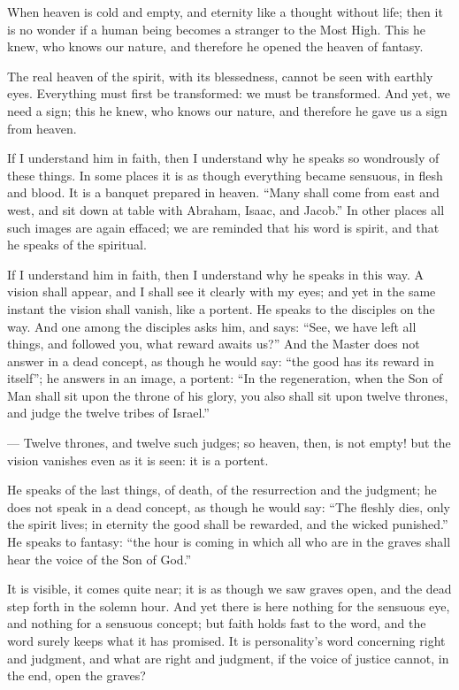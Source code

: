 \documentclass[12pt,a4paper]{book}
\begin{document}
When heaven is cold and empty, and eternity like a thought without life; then it is no wonder if a human being becomes a stranger to the Most High. This he knew, who knows our nature, and therefore he opened the heaven of fantasy.

The real heaven of the spirit, with its blessedness, cannot be seen with earthly eyes. Everything must first be transformed: we must be transformed. And yet, we need a sign; this he knew, who knows our nature, and therefore he gave us a sign from heaven.

If I understand him in faith, then I understand why he speaks so wondrously of these things. In some places it is as though everything became sensuous, in flesh and blood. It is a banquet prepared in heaven. ``Many shall come from east and west, and sit down at table with Abraham, Isaac, and Jacob.'' In other places all such images are again effaced; we are reminded that his word is spirit, and that he speaks of the spiritual.

If I understand him in faith, then I understand why he speaks in this way. A vision shall appear, and I shall see it clearly with my eyes; and yet in the same instant the vision shall vanish, like a portent. He speaks to the disciples on the way. And one among the disciples asks him, and says: ``See, we have left all things, and followed you, what reward awaits us?'' And the Master does not answer in a dead concept, as though he would say: ``the good has its reward in itself''; he answers in an image, a portent: ``In the regeneration, when the Son of Man
shall sit upon the throne of his glory, you also shall sit upon twelve thrones, and judge the twelve tribes of Israel.''

--- Twelve thrones, and twelve such judges; so heaven, then, is not empty! but the vision vanishes even as it is seen: it is a portent.

He speaks of the last things, of death, of the resurrection and the judgment; he does not speak in a dead concept, as though he would say: ``The fleshly dies, only the spirit lives; in eternity the good shall be rewarded, and the wicked punished.'' He speaks to fantasy: ``the hour is coming in which all who are in the graves shall hear the voice of the Son of God.''

It is visible, it comes quite near; it is as though we saw graves open, and the dead step forth in the solemn hour. And yet there is here nothing for the sensuous eye, and nothing for a sensuous concept; but faith holds fast to the word, and the word surely keeps what it has promised. It is personality's word concerning right and judgment, and what are right and judgment, if the voice of justice cannot, in the end, open the graves?
\end{document}
